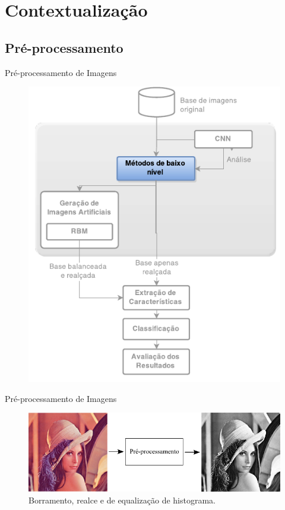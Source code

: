 \documentclass{beamer}
\begin{document}
\section{Contextualização}
\subsection{Pré-processamento}
\begin{frame}{Pré-processamento de Imagens}
\begin{figure}
    \includegraphics[height=0.75\textheight]{figuras/geral_metodos.pdf}
\end{figure}
\end{frame}
\begin{frame}{Pré-processamento de Imagens}
\begin{figure}[htbp]
 \begin{center}
   \includegraphics[width=1\linewidth]{figuras/preprocessamento.png}
 \caption{Borramento, realce e de equalização de histograma.}
 \end{center}
\end{figure}
\end{frame}
\end{document}
